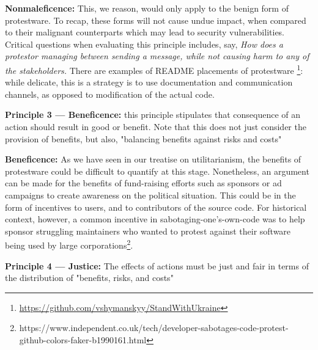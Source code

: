 \documentclass[journal,twocolumn]{IEEEtran}
\begin{document}
\textbf{Nonmaleficence:} This, we reason, would only apply to the benign form of protestware. To recap, these forms will not cause undue impact, when compared to their malignant counterparts which may lead to security vulnerabilities. 
Critical questions when evaluating this principle includes, say, \textit{How does a protestor managing between sending a message, while not causing harm to any of the stakeholders.} 
There are examples of README placements of protestware \footnote{\url{https://github.com/vshymanskyy/StandWithUkraine}}: while delicate, this is a strategy is to use documentation and communication channels, as opposed to modification of the actual code.


\begin{tcolorbox}
    \textbf{Principle 3 --- Beneficence:} this principle stipulates that consequence of an action should result in good or benefit. Note that this does not just consider the provision of benefits, but also, "balancing benefits against risks and costs" \cite{Beauchamp1994}
\end{tcolorbox}

\textbf{Beneficence:} As we have seen in our treatise on utilitarianism, the benefits of protestware could be difficult to quantify at this stage. Nonetheless, an argument can be made for the benefits of fund-raising efforts such as sponsors or ad campaigns to create awareness on the political situation. 
This could be in the form of incentives to users, and to contributors of the source code.
For historical context, however, a common incentive in sabotaging-one's-own-code was to help sponsor struggling maintainers who wanted to protest against their software being used by large corporations\footnote{https://www.independent.co.uk/tech/developer-sabotages-code-protest-github-colors-faker-b1990161.html}.

\begin{tcolorbox}
    \textbf{Principle 4 --- Justice:} The effects of actions must be just and fair in terms of the distribution of "benefits, risks, and costs" \cite{Beauchamp1994}
\end{tcolorbox}
\end{document}
